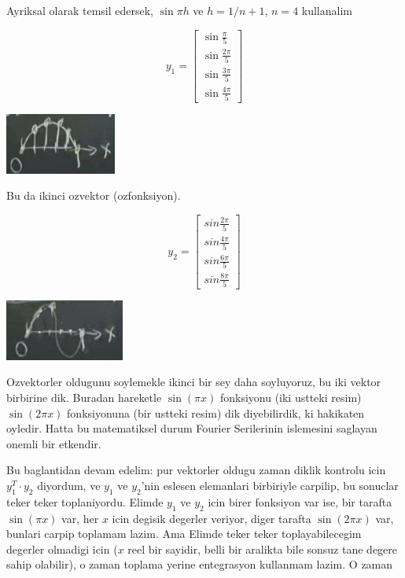 \documentclass[12pt,fleqn]{article}\usepackage{../common}
\begin{document}
Ayriksal olarak temsil edersek, $\sin\pi h$ ve $h = 1 / n+1$, $n = 4$
kullanalim

\[ 
y_1 = 
\left[\begin{array}{c}
\sin \frac{\pi}{5} \\
\sin \frac{2\pi}{5} \\
\sin \frac{3\pi}{5} \\
\sin \frac{4\pi}{5} 
\end{array}\right]
 \]


\includegraphics[height=2cm]{6_2.png}

Bu da ikinci ozvektor (ozfonksiyon). 

\[ 
y_2 = 
\left[\begin{array}{c}
sin \frac{2\pi}{5} \\
sin \frac{4\pi}{5} \\
sin \frac{6\pi}{5} \\
sin \frac{8\pi}{5} 
\end{array}\right]
 \]

\includegraphics[height=2cm]{6_3.png}

Ozvektorler oldugunu soylemekle ikinci bir sey daha soyluyoruz, bu iki
vektor birbirine dik. Buradan hareketle $\sin(\pi x)$ fonksiyonu (iki
ustteki resim) $\sin(2\pi x)$ fonksiyonuna (bir ustteki resim) dik
diyebilirdik, ki hakikaten oyledir. Hatta bu matematiksel durum Fourier
Serilerinin islemesini saglayan onemli bir etkendir.

Bu baglantidan devam edelim: pur vektorler oldugu zaman diklik kontrolu icin
$y_1^T \cdot y_2$ diyordum, ve $y_1$ ve $y_2$'nin eslesen elemanlari birbiriyle 
carpilip, bu sonuclar teker teker toplaniyordu. Elimde $y_1$ ve $y_2$ icin 
birer fonksiyon var ise, bir tarafta $\sin(\pi x)$ var, her $x$ icin degisik
degerler veriyor, diger tarafta $\sin(2\pi x)$ var, bunlari carpip toplamam
lazim. Ama Elimde teker teker toplayabilecegim degerler olmadigi icin ($x$ reel
bir sayidir, belli bir aralikta bile sonsuz tane degere sahip olabilir), o
zaman toplama yerine entegrasyon kullanmam lazim. O zaman
\end{document}
